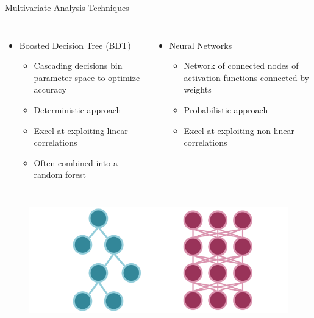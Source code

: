 \documentclass[aspectratio=169,xcolor=table]{beamer}
\begin{document}
    \begin{frame}[t]{Multivariate Analysis Techniques}
      \begin{columns}[t]
        \begin{itemize}
          \item Boosted Decision Tree (BDT)
          \begin{itemize}
            \item Cascading decisions bin parameter space to optimize accuracy
            \item Deterministic approach
            \item Excel at exploiting linear correlations
            \item Often combined into a random forest
          \end{itemize}
        \end{itemize}

        \begin{itemize}
          \item Neural Networks
          \begin{itemize}
            \item Network of connected nodes of activation functions connected by weights
            \item Probabilistic approach
            \item Excel at exploiting non-linear correlations
          \end{itemize}
        \end{itemize}
      \end{columns}

      \begin{figure}
        \begin{columns}
        \centering
        \includegraphics[height=.35\textheight,keepaspectratio=true]{BDT_vs_PNN_Diagram.png}
        \caption{\tiny \cite{BDT-vs-PNN}}
        \end{columns}
      \end{figure}
    \end{frame}
\end{document}
